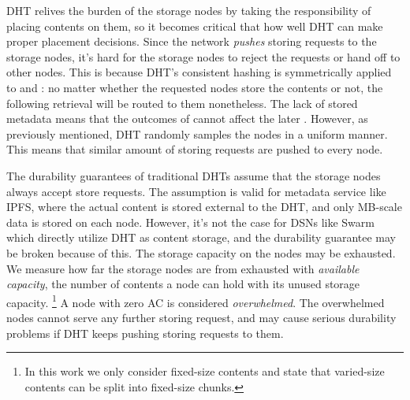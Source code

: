 

DHT relives the burden of the storage nodes by taking the responsibility of placing contents on them, so it becomes critical that how well DHT can make proper placement decisions.
Since the network \emph{pushes} storing requests to the storage nodes, it's hard for the storage nodes to reject the requests or hand off to other nodes.
This is because DHT's consistent hashing is symmetrically applied to \fput and \fget{}: no matter whether the requested nodes store the contents or not, the following retrieval will be routed to them nonetheless.
The lack of stored metadata means that the outcomes of \fput cannot affect the later \fget.
However, as previously mentioned, DHT randomly samples the nodes in a uniform manner.
This means that similar amount of storing requests are pushed to every node.

The durability guarantees of traditional DHTs assume that the storage nodes always accept store requests.
The assumption is valid for metadata service like IPFS, where the actual content is stored external to the DHT, and only MB-scale data is stored on each node.
However, it's not the case for DSNs like Swarm which directly utilize DHT as content storage, and the durability guarantee may be broken because of this.
The storage capacity on the nodes may be exhausted.
We measure how far the storage nodes are from exhausted with \emph{available capacity}, the number of contents a node can hold with its unused storage capacity.
\footnote{In this work we only consider fixed-size contents and state that varied-size contents can be split into fixed-size chunks.}
A node with zero AC is considered \emph{overwhelmed}.
The overwhelmed nodes cannot serve any further storing request, and may cause serious durability problems if DHT keeps pushing storing requests to them.

